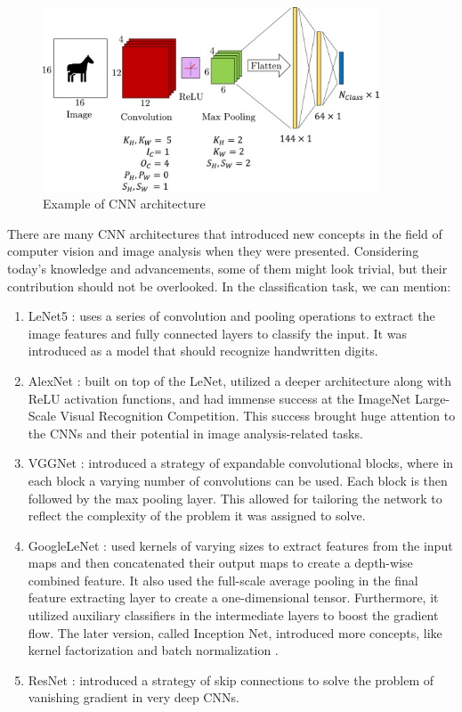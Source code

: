 \begin{figure}[H]
\begin{centering}
\includegraphics[width=10cm]{assets/images/cnn-full.jpg}
\par\end{centering}
\caption{Example of CNN architecture \cite{Santosh2022-2}}
\label{fig:full-cnn}
\end{figure}

There are many CNN architectures that introduced new concepts in the field of computer vision and image analysis when they were presented. Considering today's knowledge and advancements, some of them might look trivial, but their contribution should not be overlooked. In the classification task, we can mention:

\begin{enumerate}
    \item LeNet5 \cite{LeCun2015-2}: uses a series of convolution and pooling operations to extract the image features and fully connected layers to classify the input. It was introduced as a model that should recognize handwritten digits.
    \item AlexNet \cite{Krizhevsky2012}: built on top of the LeNet, utilized a deeper architecture along with ReLU activation functions, and had immense success at the ImageNet Large-Scale Visual Recognition Competition. This success brought huge attention to the  CNNs and their potential in image analysis-related tasks.
    \item VGGNet \cite{Simonyan2014}: introduced a strategy of expandable convolutional blocks, where in each block a varying number of convolutions can be used. Each block is then followed by the max pooling layer. This allowed for tailoring the network to reflect the complexity of the problem it was assigned to solve.
    \item GoogleLeNet \cite{Szegedy2015}: used kernels of varying sizes to extract features from the input maps and then concatenated their output maps to create a depth-wise combined feature. It also used the full-scale average pooling in the final feature extracting layer to create a one-dimensional tensor. Furthermore, it utilized auxiliary classifiers in the intermediate layers to boost the gradient flow. The later version, called Inception Net, introduced more concepts, like kernel factorization and batch normalization \cite{Szegedy2016-2}.
    \item ResNet \cite{He2016}: introduced a strategy of skip connections to solve the problem of vanishing gradient in very deep CNNs. 
\end{enumerate}

